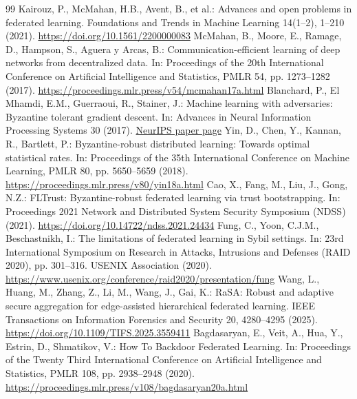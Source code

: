 \documentclass[10pt,a4paper,UTF8,fontset=fandol]{ctexart}
\begin{document}
\begingroup
\small
\begin{thebibliography}{99}
    \setlength{\itemsep}{0pt}
     Kairouz, P., McMahan, H.B., Avent, B., et al.: Advances and open problems in federated learning. Foundations and Trends in Machine Learning 14(1--2), 1--210 (2021). \url{https://doi.org/10.1561/2200000083}
     McMahan, B., Moore, E., Ramage, D., Hampson, S., Aguera y Arcas, B.: Communication-efficient learning of deep networks from decentralized data. In: Proceedings of the 20th International Conference on Artificial Intelligence and Statistics, PMLR 54, pp. 1273--1282 (2017). \url{https://proceedings.mlr.press/v54/mcmahan17a.html}
     Blanchard, P., El Mhamdi, E.M., Guerraoui, R., Stainer, J.: Machine learning with adversaries: Byzantine tolerant gradient descent. In: Advances in Neural Information Processing Systems 30 (2017). \href{https://papers.nips.cc/paper/6617-machine-learning-with-adversaries-byzantine-tolerant-gradient-descent}{NeurIPS paper page}
     Yin, D., Chen, Y., Kannan, R., Bartlett, P.: Byzantine-robust distributed learning: Towards optimal statistical rates. In: Proceedings of the 35th International Conference on Machine Learning, PMLR 80, pp. 5650--5659 (2018). \url{https://proceedings.mlr.press/v80/yin18a.html}
     Cao, X., Fang, M., Liu, J., Gong, N.Z.: FLTrust: Byzantine-robust federated learning via trust bootstrapping. In: Proceedings 2021 Network and Distributed System Security Symposium (NDSS) (2021). \url{https://doi.org/10.14722/ndss.2021.24434}
     Fung, C., Yoon, C.J.M., Beschastnikh, I.: The limitations of federated learning in Sybil settings. In: 23rd International Symposium on Research in Attacks, Intrusions and Defenses (RAID 2020), pp. 301--316. USENIX Association (2020). \url{https://www.usenix.org/conference/raid2020/presentation/fung}
     Wang, L., Huang, M., Zhang, Z., Li, M., Wang, J., Gai, K.: RaSA: Robust and adaptive secure aggregation for edge-assisted hierarchical federated learning. IEEE Transactions on Information Forensics and Security 20, 4280--4295 (2025). \url{https://doi.org/10.1109/TIFS.2025.3559411}
     Bagdasaryan, E., Veit, A., Hua, Y., Estrin, D., Shmatikov, V.: How To Backdoor Federated Learning. In: Proceedings of the Twenty Third International Conference on Artificial Intelligence and Statistics, PMLR 108, pp. 2938--2948 (2020). \url{https://proceedings.mlr.press/v108/bagdasaryan20a.html}

\end{thebibliography}
\end{document}
